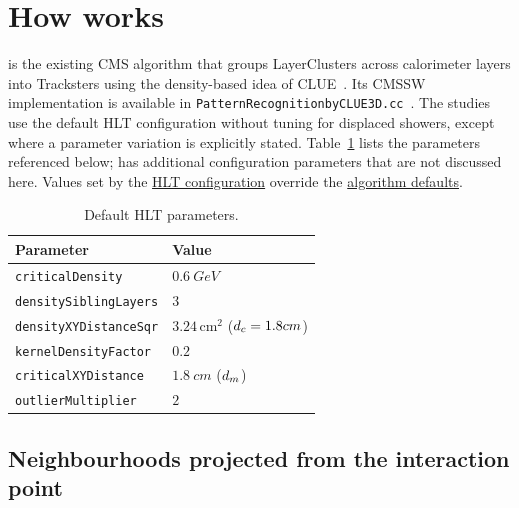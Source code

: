 \section{How \cluethreed{} works}
\label{sec:clue3d}

\cluethreed{} is the existing CMS algorithm that groups LayerClusters across
calorimeter layers into Tracksters using the density-based idea of
CLUE~\cite{Rovere2020clue}. Its CMSSW implementation is available in
\texttt{PatternRecognitionbyCLUE3D.cc}~\cite{CMSSWCLUE3D}.
The studies use the default HLT \cluethreed{}
configuration without tuning for displaced showers, except where a parameter
variation is explicitly stated. Table~\ref{tab:clue3d-defaults} lists the
parameters referenced below; \cluethreed{} has additional
configuration parameters that are not discussed here. Values set by the
\href{https://github.com/cms-sw/cmssw/blob/fdf6ff30b0b8564968dd4ae2004db5467be52eea/RecoHGCal/TICL/python/CLUE3DHighStep_cff.py#L17-L29}{HLT configuration}
override the \href{https://github.com/cms-sw/cmssw/blob/fdf6ff30b0b8564968dd4ae2004db5467be52eea/RecoHGCal/TICL/plugins/PatternRecognitionbyCLUE3D.cc#L733-L773}{algorithm defaults}.

\begin{table}[!tb]
  \centering
  \scriptsize
  \caption{Default HLT \cluethreed{} parameters.}
  \label{tab:clue3d-defaults}
  \begin{tabular}{@{}ll@{}}
    \toprule
    Parameter & Value \\
    \midrule
    \texttt{criticalDensity} & $\SI{0.6}{GeV}$ \\
    \texttt{densitySiblingLayers} & $3$ \\
    \texttt{densityXYDistanceSqr} & $3.24\,\mathrm{cm}^2$ ($d_{c}=1.8 cm$) \\
    \texttt{kernelDensityFactor} & $0.2$ \\
    \texttt{criticalXYDistance} & $\SI{1.8}{cm}$ ($d_{m}$) \\
    \texttt{outlierMultiplier} & $2$ \\
    \bottomrule
  \end{tabular}
\end{table}

\subsection{Neighbourhoods projected from the interaction point}

